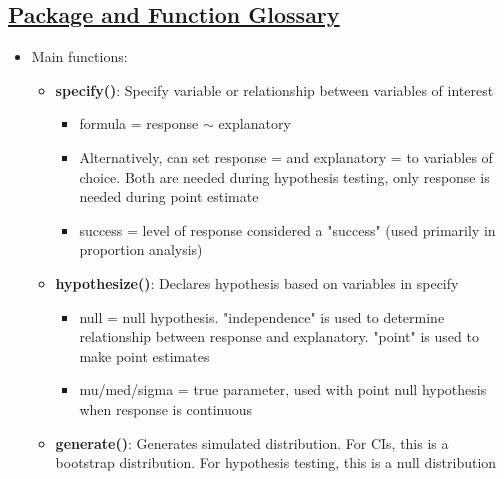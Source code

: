 \documentclass[8pt,landscape,a4paper, fleqn, dvipsnames]{extarticle}
\begin{document}
\begin{multicols*}{4}


\section*{\ul{Package and Function Glossary}}
\begin{itemize}
    \item Main functions:
    \begin{itemize}
        \item \textbf{specify()}: Specify variable or relationship between variables of interest
        \begin{itemize}
            \item formula = response $\sim$ explanatory 
            \item Alternatively, can set response = and explanatory = to variables of choice. Both are needed during hypothesis testing, only response is needed during point estimate
            \item success = level of response considered a "success" (used primarily in proportion analysis)
        \end{itemize}
        \item \textbf{hypothesize()}: Declares hypothesis based on variables in specify
        \begin{itemize}
            \item null = null hypothesis. "independence" is used to determine relationship between response and explanatory. "point" is used to make point estimates
            \item mu/med/sigma = true parameter, used with point null hypothesis when response is continuous
        \end{itemize}
        \item \textbf{generate()}: Generates simulated distribution. For CIs, this is a bootstrap distribution. For hypothesis testing, this is a null distribution
        \begin{itemize}

\end{itemize}
\end{itemize}
\end{itemize}
\end{multicols*}
\end{document}
